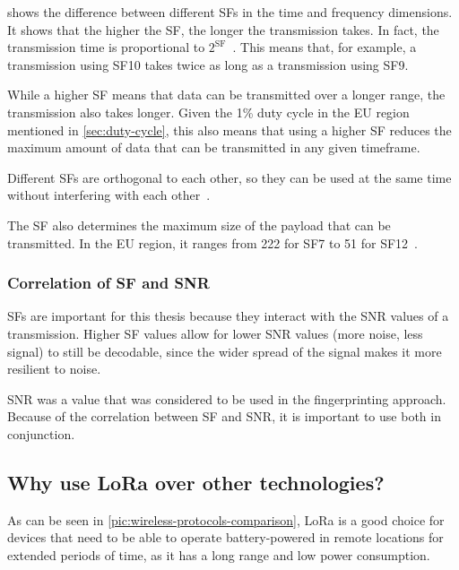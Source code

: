  shows the difference between different \aclp{SF} in the time and frequency dimensions.
It shows that the higher the \ac{SF}, the longer the transmission takes.
In fact, the transmission time is proportional to $2^{\text{SF}}$~\cite{sakshama_ghoslya_lora_2017}.
This means that, for example, a transmission using \ac{SF}10 takes twice as long as a transmission using \ac{SF}9.

While a higher \acl{SF} means that data can be transmitted over a longer range, the transmission also takes longer.
Given the 1\% duty cycle in the \ac{EU} region mentioned in \cref{sec:duty-cycle}, this also means that using a higher \acl{SF} reduces the maximum amount of data that can be transmitted in any given timeframe.

Different \aclp{SF} are orthogonal to each other, so they can be used at the same time without interfering with each other~\cite{the_things_network_spreading_2023}.

The \ac{SF} also determines the maximum size of the payload that can be transmitted.
In the \ac{EU} region, it ranges from \SI{222}{\byte} for \ac{SF}7 to \SI{51}{\byte} for \ac{SF}12~\cite[p. 10f]{lora_alliance_inc_lorawan_regional_2017}.

\subsubsection{Correlation of \acs{SF} and \acs{SNR}}\label{sec:sf-snr-correlation}

\aclp{SF} are important for this thesis because they interact with the \ac{SNR} values of a transmission.
Higher \ac{SF} values allow for lower \ac{SNR} values (more noise, less signal) to still be decodable, since the wider spread of the signal makes it more resilient to noise.

\ac{SNR} was a value that was considered to be used in the fingerprinting approach.
Because of the correlation between \acl{SF} and \acl{SNR}, it is important to use both in conjunction.

\subsection{Why use \acs{LoRa} over other technologies?}

As can be seen in \cref{pic:wireless-protocols-comparison}, \ac{LoRa} is a good choice for devices that need to be able to operate battery-powered in remote locations for extended periods of time, as it has a long range and low power consumption.

